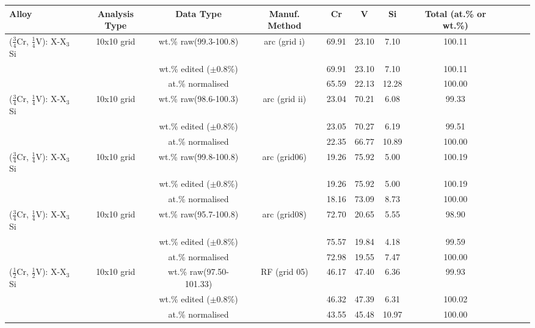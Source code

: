 %
%
\begin{landscape}
\begin{table}[htdp]
\begin{center}
\begin{tabular}{lcccccccccc}
\hline
Alloy 			&  Analysis Type		&Data Type & Manuf.  Method	&   Cr    &  V       & Si   		& Total (at.\% or wt.\%) \\
\hline
\hline

($\frac{3}{4}$Cr, $\frac{1}{4}$V): X-X$_3$Si &10x10 grid&wt.\% raw(99.3-100.8)&arc (grid i) &69.91		&23.10	&	7.10    	&100.11\\
			   &				   		&wt.\% edited ($\pm$0.8\%) & 			&	69.91	&23.10	&    7.10 	&100.11\\
			   &				   		&at.\% normalised			& 			&	65.59	&22.13&	 12.28	&100.00\\

($\frac{3}{4}$Cr, $\frac{1}{4}$V): X-X$_3$Si &10x10 grid&wt.\% raw(98.6-100.3)&arc (grid ii) &		23.04&70.21	&	 6.08   	&99.33\\
			   &				   		&wt.\% edited ($\pm$0.8\%) & 					&		23.05&70.27	&   6.19	 &99.51\\
			   &				   		&at.\% normalised			& 					&		22.35&66.77	&	10.89 	&100.00\\

($\frac{3}{4}$Cr, $\frac{1}{4}$V): X-X$_3$Si &10x10 grid&wt.\% raw(99.8-100.8)&arc (grid06)&		19.26&	75.92&	5.00    	&100.19\\
			   &				   		&wt.\% edited ($\pm$0.8\%) & 			&				19.26&	75.92&	5.00    	&100.19\\
			   &				   		&at.\% normalised			& 			&				18.16&73.09&	8.73 	&100.00\\

($\frac{3}{4}$Cr, $\frac{1}{4}$V): X-X$_3$Si &10x10 grid&wt.\% raw(95.7-100.8)&arc (grid08)&		72.70&	20.65&	5.55    	&98.90\\
			   &				   		&wt.\% edited ($\pm$0.8\%) 		&				&		75.57&19.84&	4.18    	&99.59\\
			   &				   		&at.\% normalised				& 				&		72.98&19.55&	7.47 	&100.00\\

\hline
($\frac{1}{2}$Cr, $\frac{1}{2}$V): X-X$_3$Si & 10x10 grid&wt.\% raw(97.50-101.33)&RF (grid 05)&	46.17		&		47.40	&   6.36  	&99.93\\
			   &				   		&wt.\% edited ($\pm$0.8\%) 	& 			&	46.32		&	47.39		&  	6.31	&100.02\\
			   &				   		&at.\% normalised			& 			&	43.55		&	45.48		&     10.97	&100.00\\


\end{tabular}
\end{center}
\end{table}
\end{landscape}
